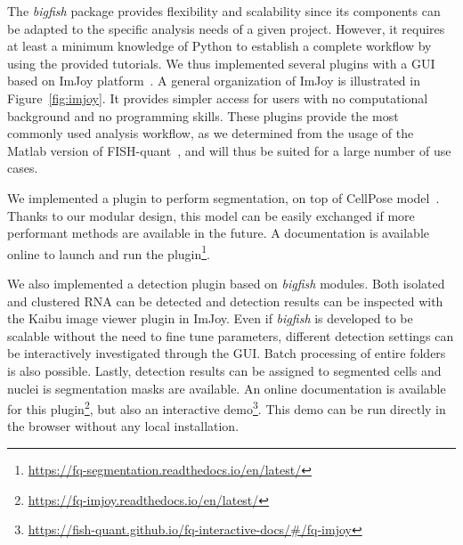 The \emph{bigfish} package provides flexibility and scalability since its components can be adapted to the specific analysis needs of a given project.
However, it requires at least a minimum knowledge of Python to establish a complete workflow by using the provided tutorials.
We thus implemented several plugins with a \ac{GUI} based on ImJoy platform~\cite{ouyang_imjoy_2019}.
A general organization of ImJoy is illustrated in Figure~\ref{fig:imjoy}.
It provides simpler access for users with no computational background and no programming skills.
These plugins provide the most commonly used analysis workflow, as we determined from the usage of the Matlab version of FISH-quant~\cite{mueller_fish-quant_2013}, and will thus be suited for a large number of use cases.

We implemented a plugin to perform segmentation, on top of CellPose model~\cite{stringer_cellpose_2021}.
Thanks to our modular design, this model can be easily exchanged if more performant methods are available in the future.
A documentation is available online to launch and run the plugin\footnote{\url{https://fq-segmentation.readthedocs.io/en/latest/}}.

We also implemented a detection plugin based on \emph{bigfish} modules.
Both isolated and clustered \ac{RNA} can be detected and detection results can be inspected with the Kaibu image viewer plugin in ImJoy.
Even if \emph{bigfish} is developed to be scalable without the need to fine tune parameters, different detection settings can be interactively investigated through the \ac{GUI}.
Batch processing of entire folders is also possible.
Lastly, detection results can be assigned to segmented cells and nuclei is segmentation masks are available.
An online documentation is available for this plugin\footnote{\url{https://fq-imjoy.readthedocs.io/en/latest/}}, but also an interactive demo\footnote{\url{https://fish-quant.github.io/fq-interactive-docs/\#/fq-imjoy}}.
This demo can be run directly in the browser without any local installation.

